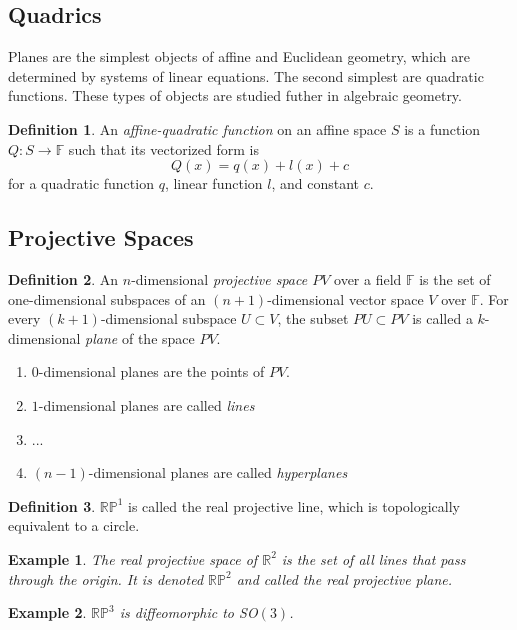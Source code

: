 \documentclass{article}
\newtheorem{example}{Example}[section]
\theoremstyle{remark}
\theoremstyle{definition}
\newtheorem{definition}{Definition}[section]
\begin{document}
\subsection{Quadrics}
Planes are the simplest objects of affine and Euclidean geometry, which are determined by systems of linear equations. The second simplest are quadratic functions. These types of objects are studied futher in algebraic geometry. 

\begin{definition}
An \textit{affine-quadratic function} on an affine space $S$ is a function $Q: S \longrightarrow \mathbb{F}$ such that its vectorized form is
\[Q(x) = q(x) + l(x) + c\]
for a quadratic function $q$, linear function $l$, and constant $c$. 
\end{definition}

\subsection{Projective Spaces}
\begin{definition}
An $n$-dimensional \textit{projective space $PV$} over a field $\mathbb{F}$ is the set of one-dimensional subspaces of an $(n+1)$-dimensional vector space $V$ over $\mathbb{F}$. For every $(k+1)$-dimensional subspace $U \subset V$, the subset $PU \subset PV$ is called a $k$-dimensional \textit{plane} of the space $PV$. 
\begin{enumerate}
    \item $0$-dimensional planes are the points of $PV$. 
    \item $1$-dimensional planes are called \textit{lines}
    \item ...
    \item $(n-1)$-dimensional planes are called \textit{hyperplanes}
\end{enumerate}
\end{definition}

\begin{definition}
$\mathbb{RP}^1$ is called the real projective line, which is topologically equivalent to a circle. 
\end{definition}

\begin{example}
The real projective space of $\mathbb{R}^2$ is the set of all lines that pass through the origin. It is denoted $\mathbb{R P}^2$ and called the \textit{real projective plane}. 
\end{example}

\begin{example}
$\mathbb{RP}^3$ is diffeomorphic to SO$(3)$. 
\end{example}
\end{document}
